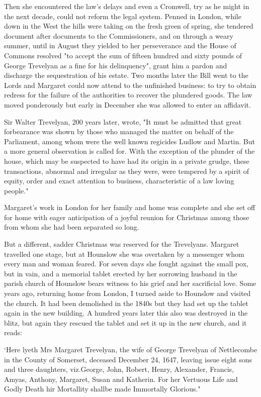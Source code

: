 Then she encountered the law's delays   and even a Cromwell, try as he might in the next decade, could not reform the legal system. Penned in London, while down in the West the hills were taking on the fresh green of spring, she tendered document after documents to the Commissioners, and on through a weary summer, until in August they yielded to her perseverance and the House of Commons resolved "to accept the sum of fifteen hundred and sixty pounds of George Trevelyan as a fine for his delinquency", grant him a pardon and discharge the sequestration of his estate. Two months later the Bill went to the Lords and Margaret could now attend to the unfinished business: to try to obtain redress for the failure of the authorities to recover the plundered goods. The law moved ponderously but early in December she was allowed to enter an affidavit.

Sir Walter Trevelyan, 200 years later, wrote, "It must be admitted that great forbearance was shown by those who managed the matter on behalf of the Parliament, among whom were the well known regicides Ludlow and Martin. But a more general observation is called for. With the exception of the plunder of the house, which may be suspected to have had its origin in a private grudge, these transactions, abnormal and irregular as they were, were tempered by a spirit of equity, order and exact attention to business, characteristic of a law loving people."

Margaret's work in London for her family and home was complete and she set off for home with eager anticipation of a joyful reunion for Christmas among those from whom she had been separated so long.

But a different, sadder Christmas was reserved for the Trevelyans. Margaret travelled one stage, but at Hounslow she was overtaken by a messenger whom every man and woman feared. For seven days she fought against the small pox, but in vain, and a memorial tablet erected by her sorrowing husband in the parish church of Hounslow bears witness to his grief and her sacrificial love. Some years ago, returning home from London, I turned aside to Hounslow and visited the church. It had been demolished in the 1840s but they had set up the tablet again in the new building. A hundred years later this also was destroyed in the blitz, but again they rescued the tablet and set it up in the new church, and it reads:

‘Here lyeth Mrs Margaret Trevelyan, the wife of George Trevelyan of Nettlecombe in the County of Somerset, deceased December 24, 1647, leaving issue eight sons and three daughters, viz.George, John, Robert, Henry, Alexander, Francis, Amyas, Anthony, Margaret, Susan and Katherin. For her Vertuous Life and Godly Death hir Mortallity shallbe made Immortally Glorious."

